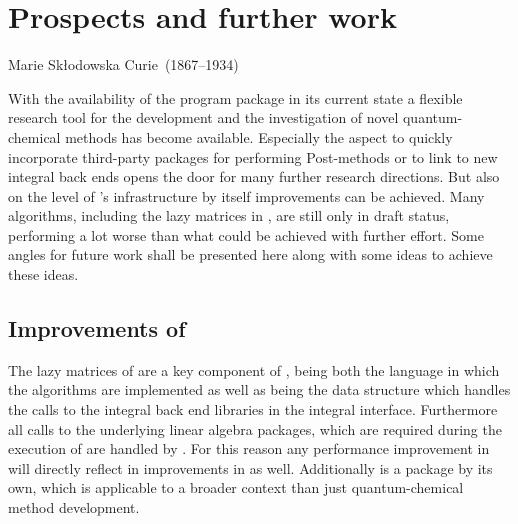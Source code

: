 \chapter{Prospects and further work}
\label{ch:Prospects}
{Marie Skłodowska Curie~(1867--1934)}

\noindent
With the availability of the \molsturm program package in its
current state a flexible research tool
for the development and the investigation of novel quantum-chemical methods
has become available.
Especially the aspect to quickly incorporate third-party packages
for performing Post-\HF methods or to link to new integral back ends
opens the door for many further research directions.
But also on the level of \molsturm's infrastructure
by itself improvements can be achieved.
Many algorithms, including the lazy matrices in \lazyten,
are still only in draft status,
performing a lot worse than what could be achieved with further effort.
Some angles for future work shall be presented here
along with some ideas to achieve these ideas.

\section{Improvements of \lazyten}
The lazy matrices of \lazyten are a key component of \molsturm,
being both the language in which the \SCF algorithms are implemented
as well as being the data structure
which handles the calls to the integral back end libraries
in the integral interface.
Furthermore all calls to the underlying linear algebra packages,
which are required during the execution of \molsturm
are handled by \lazyten.
For this reason any performance
improvement in \lazyten will directly reflect in improvements
in \molsturm as well.
Additionally \lazyten is a package by its own,
which is applicable to a broader context than just
quantum-chemical method development.

